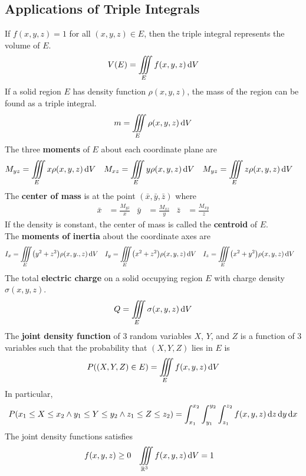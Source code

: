 \documentclass[../Calculus \Roman{3}.tex]{subfiles}
\begin{document}
		\subsection*{Applications of Triple Integrals}
			If $f(x, y, z) = 1$ for all $(x, y, z) \in E$, then the triple integral represents the volume of $E$.
				\[V(E) = \iiint\limits_E f(x, y, z)\,\mathrm{d} V\]
			If a solid region $E$ has density function $\rho(x, y, z)$, the mass of the region can be found as a triple integral.
				\[m = \iiint\limits_E \rho(x, y, z)\,\mathrm{d} V\]
				The three \textbf{moments} of $E$ about each coordinate plane are
					\begin{align*}
						M_{yz} &= \iiint\limits_E x\rho(x, y, z)\,\mathrm{d} V &
								M_{xz} &= \iiint\limits_E y\rho(x, y, z)\,\mathrm{d} V &
								M_{yz} &= \iiint\limits_E z\rho(x, y, z)\,\mathrm{d} V
					\end{align*}
				The \textbf{center of mass} is at the point $(\bar{x}, \bar{y}, \bar{z})$ where
					\begin{align*}
						\bar{x} &= \frac{M_{yz}}{x} &
								\bar{y} &= \frac{M_{xz}}{y} &
								\bar{z} &= \frac{M_{xy}}{z}
					\end{align*}
					If the density is constant, the center of mass is called the \textbf{centroid} of $E$. \\
				The \textbf{moments of inertia} about the coordinate axes are
					\begin{align*}
						I_x &= \iiint\limits_E \bigl(y^2 + z^2\bigr)\rho(x, y., z)\,\mathrm{d} V &
								I_y &= \iiint\limits_E \bigl(x^2 + z^2\bigr)\rho(x, y, z)\,\mathrm{d} V &
								I_z &= \iiint\limits_E \bigl(x^2 + y^2\bigr)\rho(x, y, z)\,\mathrm{d} V
					\end{align*}
				The total \textbf{electric charge} on a solid occupying region $E$ with charge density $\sigma(x, y, z)$.
					\[Q = \iiint\limits_E \sigma(x, y, z)\,\mathrm{d} V\]
				The \textbf{joint density function} of 3 random variables $X$, $Y$, and $Z$ is a function of 3 variables such that the probability that $(X, Y, Z)$ lies in $E$ is
					\[P((X, Y, Z) \in E) = \iiint\limits_E f(x, y, z)\,\mathrm{d} V\]
					In particular,
					\[P(x_1 \le X \le x_2 \land y_1 \le Y \le y_2 \land z_1 \le Z \le z_2) = \int_{x_1}^{x_2}\int_{y_1}^{y_2}\int_{z_1}^{z_2} f(x, y, z)\,\mathrm{d} z\,\mathrm{d} y\,\mathrm{d} x\]
					The joint density functions satisfies
						\begin{align*}
							f(x, y, z) &\ge 0 &
									\iiint\limits_{\mathbb{R}^3} f(x, y, z)\,\mathrm{d} V &= 1
						\end{align*}
\end{document}

